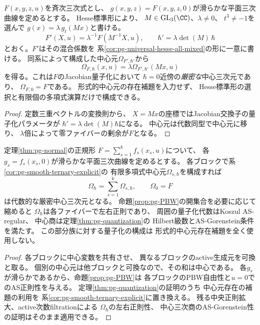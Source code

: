 \begin{corollary}[任意の滑らかな平面三次制限]\label{cor:pg-smooth-ternary-explicit}
$F(x,y,z,u)$を斉次三次式とし、
$g(x,y,z)=F(x,y,z,0)$が滑らかな平面三次曲線を定めるとする。
Hesse標準形\cite[Lemma~1]{ArtebaniDolgachev}により、
$M\in\mathrm{GL}_3(\CC)$、$\lambda\ne0$、
$t^3\ne-1$を選んで
$g(x)=\lambda\,g_t(Mx)$と書ける。
\begin{equation}
 F'(X,u)=\lambda^{-1}F(M^{-1}X,u),
 \qquad \hbar'=\lambda\det(M)\,\hbar
\end{equation}
とおく。$F'$はその混合係数を
系\ref{cor:pg-universal-hesse-all-mixed}の形に一意に書ける。
同系によって構成した中心元$\Omega_{F',\hbar'}$から
\begin{equation}
 \boxed{\quad
 \Omega_{F,\hbar}(x,u)
 =\lambda\Omega_{F',\hbar'}(Mx,u)
 \quad}
 \label{eq:pg-hm-arbitrary-ternary}
\end{equation}
を得る。これは$F$のJacobian量子化において
$\hbar=0$近傍の\emph{厳密な}中心三次元であり、
$\Omega_{F,0}=F$である。
形式的中心元の存在補題を入力せず、
Hesse標準形の選択と有限個の多項式演算だけで構成できる。
\end{corollary}
\begin{proof}
定数三重ベクトルの変換則から、
$X=Mx$の座標ではJacobian交換子の量子化パラメータが
$\hbar'=\lambda\det(M)\hbar$になる。
中心元は代数同型で中心元に移り、
$\lambda$倍によって零ファイバーの剰余が$F$となる。
\end{proof}

\begin{corollary}[滑らかな制限を持つ全Poissonブロックの明示的代数的量子化]
\label{cor:pg-smooth-block-algebraic-quant}
定理\ref{thm:pg-normal}の正規形
$F=\sum_{s=1}^k f_s(x_s,u)$について、
各$g_s=f_s(x_s,0)$が滑らかな平面三次曲線を定めるとする。
各ブロックで系\ref{cor:pg-smooth-ternary-explicit}の
有限多項式中心元$\Omega_{s,\hbar}$を構成すれば
\begin{equation}
 \Omega_\hbar=\sum_{s=1}^k\Omega_{s,\hbar},
 \qquad \Omega_0=F
\end{equation}
は代数的な厳密中心三次元となる。
命題\ref{prop:pg-PBW}の開集合を必要に応じて縮めると
$\Omega_\hbar$は各ファイバーで左右正則であり、
周囲の量子化代数はKoszul AS-regular、
中心商は定理\ref{thm:pg-quantization}の
Hilbert級数とAS-Gorenstein条件を満たす。
この部分族に対する量子化の構成は
形式的中心元存在補題を全く使用しない。
\end{corollary}
\begin{proof}
各ブロックに中心変数を共有させ、
異なるブロックのactive生成元を可換と取る。
個別の中心元は他ブロックと可換なので、その和は中心である。
各$g_s$が滑らかであるから、命題\ref{prop:pg-PBW}は
各ブロックのPBW自由性と$u=0$でのAS正則性を与える。
定理\ref{thm:pg-quantization}の証明のうち
中心元存在の補題の利用を
系\ref{cor:pg-smooth-ternary-explicit}に置き換える。
残る中央正則拡大、active次数filtrationによる
$\Omega_\hbar$の左右正則性、
中心三次商のAS-Gorenstein性の証明はそのまま適用できる。
\end{proof}

